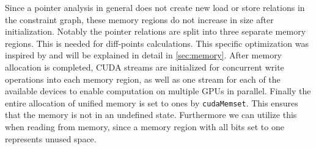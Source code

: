 Since a pointer analysis in general does not create new load or store relations in the constraint graph, these memory regions do not increase in size after initialization.
Notably the pointer relations are split into three separate memory regions. This is needed for diff-points calculations. This specific optimization was inspired by \cite{mendez2010parallel} and will be explained in detail in \autoref{sec:memory}.
After memory allocation is completed, CUDA streams are initialized for concurrent write operations into each memory region, as well as one stream for each of the available devices to enable computation on multiple GPUs in parallel.
Finally the entire allocation of unified memory is set to ones by \verb|cudaMemset|. This ensures that the memory is not in an undefined state. Furthermore we can utilize this when reading from memory, since a memory region with all bits set to one represents unused space.









